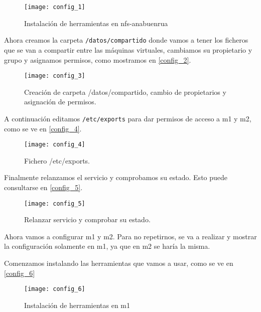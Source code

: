 \begin{figure}[h!]
\begin{center}
\caption{Instalación de herramientas en nfs-anabuenrua}
\label{config_1}
\texttt{[image: config\_1]}
\end{center}
\end{figure}

Ahora creamos la carpeta \verb|/datos/compartido| donde vamos a tener los ficheros que se van a compartir entre las máquinas virtuales, cambiamos su propietario y grupo y asignamos permisos, como mostramos en \eqref{config_2}.

\begin{figure}[h!]
\begin{center}
\caption{Creación de carpeta /datos/compartido, cambio de propietarios y asignación de permisos.}
\label{config_2}
\texttt{[image: config\_3]}
\end{center}
\end{figure}

A continuación editamos \verb|/etc/exports| para dar permisos de acceso a m1 y m2, como se ve en \eqref{config_4}.

\begin{figure}[h!]
\begin{center}
\caption{Fichero /etc/exports.}
\label{config_4}
\texttt{[image: config\_4]}
\end{center}
\end{figure}

Finalmente relanzamos el servicio y comprobamos su estado. Esto puede consultarse en \eqref{config_5}.

\begin{figure}[h!]
\begin{center}
\caption{Relanzar servicio y comprobar su estado.}
\label{config_5}
\texttt{[image: config\_5]}
\end{center}
\end{figure}

Ahora vamos a configurar m1 y m2. Para no repetirnos, se va a realizar y mostrar la configuración solamente en m1, ya que en m2 se haría la misma.

Comenzamos instalando las herramientas que vamos a usar, como se ve en \eqref{config_6}

\begin{figure}[h!]
\begin{center}
\caption{Instalación de herramientas en m1}
\label{config_6}
\texttt{[image: config\_6]}
\end{center}
\end{figure}

